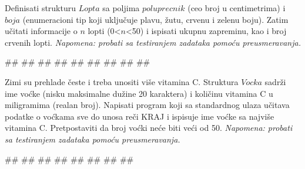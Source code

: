 \begin{Exercise}[label=p2.5_02] 
Definisati strukturu $Lopta$ sa poljima $poluprecnik$ (ceo broj u centimetrima) i $boja$ (enumeracioni tip koji uključuje plavu, žutu, crvenu i zelenu boju). Zatim učitati informacije o $n$ lopti (0<$n$<50) i ispisati ukupnu zapreminu, kao i broj crvenih lopti. \textit{Napomena: probati sa testiranjem zadataka pomoću preusmeravanja.}\\
\begin{maxitest}
\begin{upotreba}{1}
#\naslovInt#
##
##
##
##
##
##
##
##
\end{upotreba}
\end{maxitest}

\end{Exercise}
\begin{Answer}[ref=p2.5_02]
\end{Answer}

\begin{Exercise}[label=p2.5_03] 
 Zimi su prehlade česte i treba unositi više vitamina C. Struktura $Vocka$ sadrži ime voćke (nisku maksimalne dužine 20 karaktera) i količinu vitamina C u miligramima (realan broj). Napisati program koji sa standardnog ulaza učitava podatke o voćkama sve do unosa reči KRAJ i ispisuje ime voćke sa najviše vitamina C. Pretpostaviti da broj voćki neće biti veći od 50. \textit{Napomena: probati sa testiranjem zadataka pomoću preusmeravanja.}\\
\begin{maxitest}
\begin{upotreba}{1}
#\naslovInt#
##
##
##
##
##
##
##
\end{upotreba}
\end{maxitest}

\end{Exercise}
\begin{Answer}[ref=p2.5_03]
\end{Answer}

